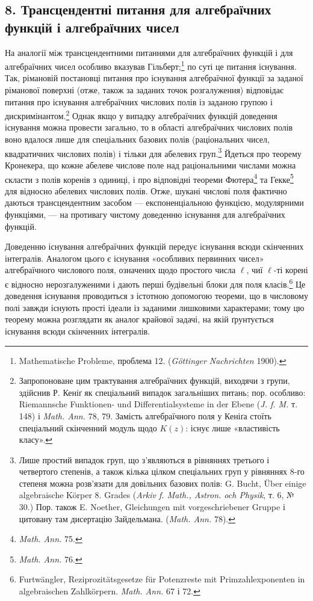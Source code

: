 \documentclass[11pt]{article}
\begin{document}
\subsection*{8. Трансцендентні питання для алгебраїчних функцій і алгебраїчних чисел}
На аналогії між трансцендентними питаннями для алгебраїчних функцій і для алгебраїчних чисел особливо вказував Гільберт;\footnote{Mathematische Probleme, проблема 12. (\emph{Göttinger Nachrichten} 1900).} по суті це питання існування. Так, рімановій постановці питання про існування алгебраїчної функції за заданої ріманової поверхні (отже, також за заданих точок розгалуження) відповідає питання про існування алгебраїчних числових полів із заданою групою і дискримінантом.\footnote{Запропоноване цим трактування алгебраїчних функцій, виходячи з групи, здійснив Р. Кеніґ як спеціальний випадок загальніших питань; пор. особливо: Riemannsche Funktionen- und Differentialsysteme in der Ebene (\emph{J. f. M.} т. 148) і \emph{Math. Ann.} 78, 79. Замість алгебраїчного поля у Кеніґа стоїть спеціальний скінченний модуль щодо \(K(z)\): існує лише «властивість класу».} Однак якщо у випадку алгебраїчних функцій доведення існування можна провести загально, то в області алгебраїчних числових полів воно вдалося лише для спеціальних базових полів (раціональних чисел, квадратичних числових полів) і тільки для абелевих груп.\footnote{Лише простий випадок груп, що з'являються в рівняннях третього і четвертого степенів, а також кілька цілком спеціальних груп у рівняннях 8-го степеня можна розв'язати для довільних базових полів: G. Bucht, Über einige algebraische Körper 8. Grades (\emph{Arkiv f. Math., Astron. och Physik}, т. 6, № 30.) Пор. також E. Noether, Gleichungen mit vorgeschriebener Gruppe і цитовану там дисертацію Зайдельмана. (\emph{Math. Ann.} 78).} Йдеться про теорему Кронекера, що кожне абелеве числове поле над раціональними числами можна скласти з полів коренів з одиниці, і про відповідні теореми Фютера\footnote{\emph{Math. Ann.} 75.} та Гекке\footnote{\emph{Math. Ann.} 76.} для відносно абелевих числових полів. Отже, шукані числові поля фактично даються трансцендентним засобом --- експоненціальною функцією, модулярними функціями, --- на противагу чистому доведенню існування для алгебраїчних функцій.

Доведенню існування алгебраїчних функцій передує існування всюди скінченних інтегралів. Аналогом цього є існування «особливих первинних чисел» алгебраїчного числового поля, означених щодо простого числа \(\ell\), чиї \(\ell\)-ті корені є відносно нерозгалуженими і дають перші будівельні блоки для поля класів.\footnote{Furtwängler, Reziprozitätsgesetze für Potenzreste mit Primzahlexponenten in algebraischen Zahlkörpern. \emph{Math. Ann.} 67 і 72.} Це доведення існування проводиться з істотною допомогою теореми, що в числовому полі завжди існують прості ідеали із заданими лишковими характерами; тому цю теорему можна розглядати як аналог крайової задачі, на якій ґрунтується існування всюди скінченних інтегралів.
\end{document}
